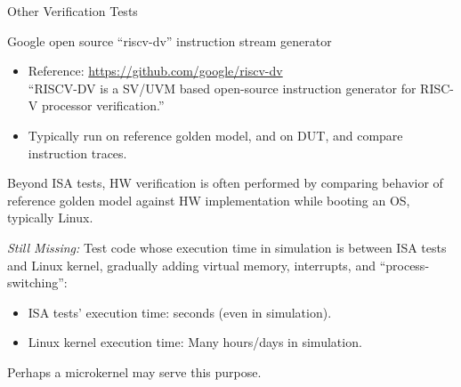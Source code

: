 \documentclass{article}
\begin{document}
\clearpage


\begin{center}
  {\Huge
    Other Verification Tests}

  \vspace*{1in}

  \begin{minipage}{9in}\Large
    Google open source ``riscv-dv'' instruction stream generator

    \begin{itemize}
    \item Reference: \url{https://github.com/google/riscv-dv} \\
    ``RISCV-DV is a SV/UVM based open-source instruction
      generator for RISC-V processor verification.''

    \item Typically run on reference golden model, and on DUT, and compare
      instruction traces.
    \end{itemize}

    \vspace*{0.75in}

    Beyond ISA tests, HW verification is often performed by comparing
    behavior of reference golden model against HW implementation while
    booting an OS, typically Linux.

    \vspace*{0.75in}

    \emph{Still Missing:} Test code whose execution time in simulation
    is between ISA tests and Linux kernel, gradually adding virtual
    memory, interrupts, and ``process-switching'':

    \begin{itemize}
    \item ISA tests' execution time: seconds (even in simulation).
    \item Linux kernel execution time: Many hours/days in simulation.
    \end{itemize}
    
    Perhaps a microkernel may serve this purpose.

  \end{minipage}
\end{center}

\clearpage

\end{document}
